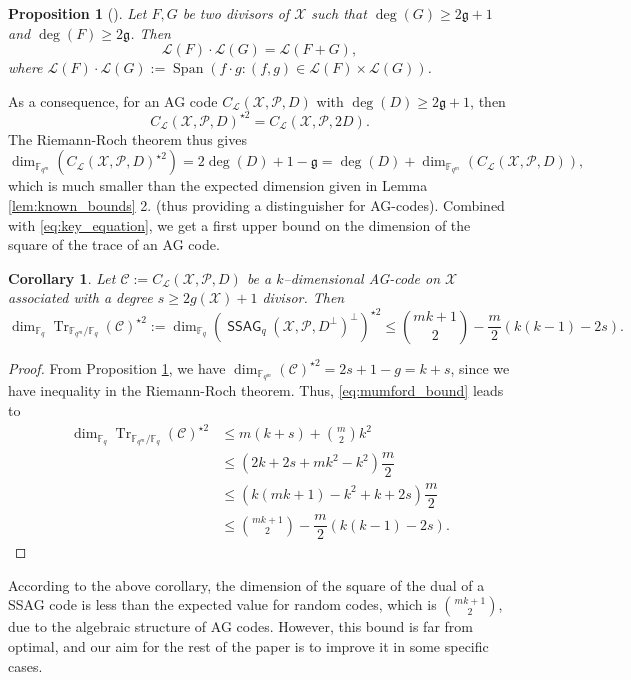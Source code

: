 \documentclass[a4paper]{article}
\newtheorem{proposition}[thm]{Proposition}
\newtheorem{coro}[thm]{Corollary}
\theoremstyle{definition}
\theoremstyle{remark}
\newcommand{\calP}{\mathcal{P}}
\newcommand{\calL}{\mathcal{L}}
\newcommand{\calC}{\mathcal{C}}
\newcommand{\calX}{\mathcal{X}}
\newcommand{\fqm}{\mathbb{F}_{q^m}}
\newcommand{\fq}{\mathbb{F}_{q}}
\newcommand{\Tr}[1]{\operatorname{Tr}_{\mathbb{F}_{q^m}/\fq}\left(#1\right)}
\newcommand{\Span}[1]{\operatorname{Span}\left(#1\right)}
\newcommand{\ssag}[1]{\operatorname{\mathsf{SSAG}}_{q}\left(#1\right)}
\begin{document}
\begin{proposition} [{\cite[Theorem~6]{Mum70}}] \label{prop:mumford_result}
 Let $F,G$ be two divisors of $\calX$ such that $\deg(G) \geq 2\mathfrak{g}+1$ and $\deg(F) \geq 2\mathfrak{g}$. Then
 \[ \calL(F) \cdot \calL(G) = \calL(F+G),\]
 where $\calL(F) \cdot \calL(G) := \Span{ f \cdot g : (f,g) \in \calL(F) \times \calL(G)}$.
\end{proposition}
\noindent As a consequence, for an AG code  $C_{\calL}(\calX,\mathcal{P},D)$ with $\deg(D) \geq 2\mathfrak{g}+1$, then 
\[ C_{\calL}(\calX,\mathcal{P},D)^{\star2} = C_{\calL}(\calX,\calP,2D).\]
The Riemann-Roch theorem thus gives
\[ \dim_{\fqm}(C_{\calL}(\calX,\mathcal{P},D)^{\star2}) = 2\deg(D)+1-\mathfrak{g}= \deg(D) + \dim_{\fqm}(C_{\calL}(\calX,\mathcal{P},D)), \]
which is much smaller than the expected dimension given in Lemma \ref{lem:known_bounds} 2. (thus providing a distinguisher for AG-codes). Combined with \eqref{eq:key_equation}, we get a first upper bound on the dimension of the square of the trace of an AG code.

\begin{coro} \label{coro:1st_bound_mumford}
 Let $\mathcal{C} := C_{\calL}(\calX,\mathcal{P},D)$ be a $k$--dimensional AG-code on $\calX$ associated with a degree $s \geq 2g(\calX)+1$ divisor. Then
 \[ \dim_{\fq}\Tr{\calC}^{\star2} := \dim_{\fq} (\ssag{\calX,\calP,D^{\perp}}^{\perp})^{\star2}  \leq \binom{mk+1}{2} - \dfrac{m}{2} (k(k-1)-2s).\]
\end{coro}

\begin{proof}
 From Proposition \ref{prop:mumford_result}, we have $\dim_{\fqm}(\calC)^{\star2} = 2s+1-g = k+s$, since we have inequality in the Riemann-Roch theorem. Thus, \eqref{eq:mumford_bound} leads to
 \begin{align*}
  \dim_{\fq}\Tr{\calC}^{\star2} &\leq m(k+s) + \binom{m}{2}k^2 \\
  &\leq (2k+2s+mk^2-k^2) \dfrac{m}{2} \\
  &\leq (k(mk+1)-k^2+k+2s) \dfrac{m}{2} \\
  &\leq \binom{mk+1}{2} - \dfrac{m}{2}(k(k-1)-2s) .
 \end{align*}
\end{proof}

According to the above corollary, the dimension of the square of the dual of a SSAG code is less than the expected value for random codes, which is $\binom{mk+1}{2}$, due to the algebraic structure of AG codes. However, this bound is far from optimal, and our aim for the rest of the paper is to improve it in some specific cases.
\end{document}
